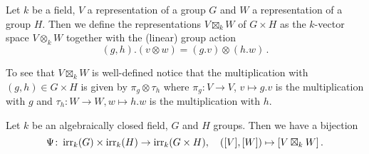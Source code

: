 \begin{defi}
  Let $k$ be a field, $V$ a representation of a group $G$ and $W$ a representation of a group $H$.
  Then we define the representations $V \boxtimes_k W$ of $G \times H$ as the $k$-vector space $V \otimes_k W$ together with the (linear) group action
  \[
      (g,h).(v \otimes w)
    = (g.v) \otimes (h.w) \,.
  \]
\end{defi}


To see that $V \boxtimes_k W$ is well-defined notice that the multiplication with $(g,h) \in G \times H$ is given by $\pi_g \otimes \tau_h$ where $\pi_g \colon V \to V$, $v \mapsto g.v$ is the multiplication with $g$ and $\tau_h \colon W \to W, w \mapsto h.w$ is the multiplication with $h$.


\begin{thrm}
  Let $k$ be an algebraically closed field, $G$ and $H$ groups.
  Then we have a bijection
  \[
            \Psi
    \colon  \operatorname{irr}_k(G) \times \operatorname{irr}_k(H)
    \to     \operatorname{irr}_k(G \times H),
    \quad   ([V],[W])
    \mapsto [V \boxtimes_k W] \,.
  \]
\end{thrm}
